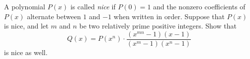 A polynomial $P(x)$ is called \emph{nice} if $P(0) = 1$ and the nonzero coefficients of $P(x)$ alternate between $1$ and $-1$ when written in order. Suppose that $P(x)$ is nice, and let $m$ and $n$ be two relatively prime positive integers. Show that \[Q(x) = P(x^n) \cdot \frac{(x^{mn} - 1)(x-1)}{(x^m-1)(x^n-1)}\] is nice as well.